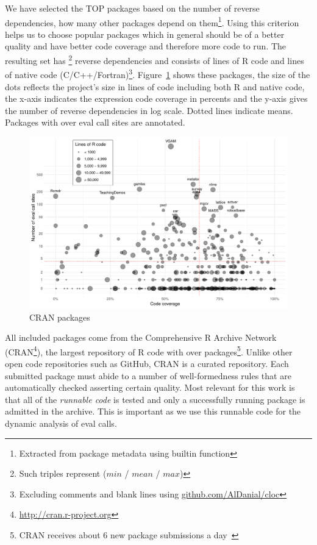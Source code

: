 \documentclass[conference]{IEEEtran}
\begin{document}
We have selected the TOP \CorpusPackages packages based on the number of reverse
dependencies, \ie how many other packages depend on them\footnote{Extracted from
  package metadata using builtin function}. Using this criterion helps us to
choose popular packages which in general should be of a better quality and have
better code coverage and therefore more code to run. The resulting set has
\footnote{Such triples represent ($min$ / $mean$ /
  $max$)} reverse dependencies and consists of \CorpusRCodeRnd lines of R code
and \CorpusNativeCodeRnd lines of native code (C/C++/Fortran)\footnote{Excluding
  comments and blank lines using \url{github.com/AlDanial/cloc}}.
Figure~\ref{fig:corpus} shows these packages, the size of the dots reflects the
project's size in lines of code including both R and native code, the x-axis
indicates the expression code coverage in percents and the y-axis gives the
number of reverse dependencies in log scale. Dotted lines indicate means.
Packages with over \CorpusEvalsPackageTreshold eval call sites are annotated.

\begin{figure}[!tb]\centering\includegraphics[width=\linewidth]
  {corpus.pdf}\caption{CRAN packages}\label{fig:corpus}
\end{figure}

All included packages come from the Comprehensive R Archive Network
(CRAN\footnote{\url{http://cran.r-project.org}}), the largest repository of R
code with over \CorpusAllCranRnd packages\footnote{CRAN receives about 6 new
  package submissions a day~\cite{Ligges2017}}. Unlike other open code
repositories such as GitHub, CRAN is a curated repository. Each submitted
package must abide to a number of well-formedness rules that are automatically
checked asserting certain quality. Most relevant for this work is that all of
the \emph{runnable code} is tested and only a successfully running package is
admitted in the archive. This is important as we use this runnable code for the
dynamic analysis of eval calls.
\end{document}
